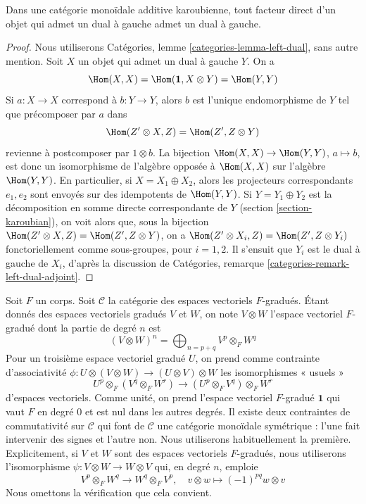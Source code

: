 \begin{lemma}
\label{lemma-Karoubian-dual}
Dans une catégorie monoïdale additive karoubienne, tout facteur direct
d'un objet qui admet un dual à gauche admet un dual à gauche.
\end{lemma}

\begin{proof}
Nous utiliserons Catégories, lemme \ref{categories-lemma-left-dual},
sans autre mention.
Soit $X$ un objet qui admet un dual à gauche $Y$. On a
$$
\Hom(X, X) = \Hom(\mathbf{1}, X \otimes Y) = \Hom(Y, Y)
$$
Si $a : X \to X$ correspond à $b : Y \to Y$, alors $b$ est l'unique
endomorphisme de $Y$ tel que précomposer par $a$ dans
$$
\Hom(Z' \otimes X, Z) = \Hom(Z', Z \otimes Y)
$$
revienne à postcomposer par $1 \otimes b$.
La bijection $\Hom(X, X) \to \Hom(Y, Y)$, $a \mapsto b$,
est donc un isomorphisme de l'algèbre opposée à $\Hom(X, X)$ sur
l'algèbre $\Hom(Y, Y)$. En particulier, si $X = X_1 \oplus X_2$, alors
les projecteurs correspondants $e_1, e_2$ sont envoyés sur des idempotents
de $\Hom(Y, Y)$. Si $Y = Y_1 \oplus Y_2$ est la décomposition en somme
directe correspondante de $Y$ (section \ref{section-karoubian}),
on voit alors que, sous la bijection
$\Hom(Z' \otimes X, Z) = \Hom(Z', Z \otimes Y)$,
on a $\Hom(Z' \otimes X_i, Z) = \Hom(Z', Z \otimes Y_i)$
fonctoriellement comme sous-groupes, pour $i = 1, 2$.
Il s'ensuit que $Y_i$ est le dual à gauche de
$X_i$, d'après la discussion de
Catégories, remarque \ref{categories-remark-left-dual-adjoint}.
\end{proof}

\begin{example}
\label{example-graded-vector-spaces}
Soit $F$ un corps. Soit $\mathcal{C}$ la catégorie des espaces vectoriels
$F$-gradués. Étant donnés des espaces vectoriels gradués $V$ et $W$, on
note $V \otimes W$ l'espace vectoriel $F$-gradué dont la
partie de degré $n$ est
$$
(V \otimes W)^n = \bigoplus\nolimits_{n = p + q} V^p \otimes_F W^q
$$
Pour un troisième espace vectoriel gradué $U$, on prend comme contrainte d'associativité
$\phi : U \otimes (V \otimes W) \to (U \otimes V) \otimes W$
les isomorphismes « usuels »
$$
U^p \otimes_F (V^q \otimes_F W^r) \to (U^p \otimes_F V^q) \otimes_F W^r
$$
d'espaces vectoriels. Comme unité, on prend l'espace vectoriel $F$-gradué $\mathbf{1}$
qui vaut $F$ en degré $0$ et est nul dans les autres degrés.
Il existe deux contraintes de commutativité sur $\mathcal{C}$
qui font de $\mathcal{C}$ une catégorie monoïdale symétrique : l'une fait
intervenir des signes et l'autre non. Nous utiliserons habituellement
la première. Explicitement, si $V$ et $W$ sont des espaces vectoriels $F$-gradués,
nous utiliserons l'isomorphisme $\psi : V \otimes W \to W \otimes V$
qui, en degré $n$, emploie
$$
V^p \otimes_F W^q \to W^q \otimes_F V^p,\quad
v \otimes w \mapsto (-1)^{pq} w \otimes v
$$
Nous omettons la vérification que cela convient.
\end{example}

